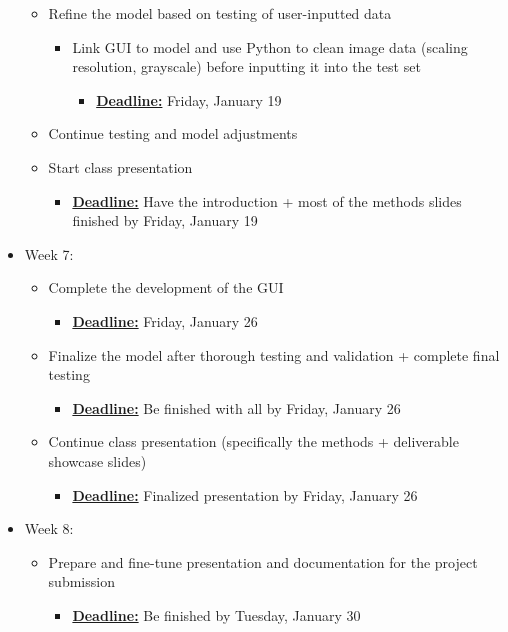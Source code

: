 \documentclass{notes}
\begin{document}
\begin{itemize}
        \begin{itemize}
            \item Refine the model based on testing of user-inputted data
            \begin{itemize}
                \item Link GUI to model and use Python to clean image data (scaling resolution, grayscale) before inputting it into the test set
                \begin{itemize}
                    \item \underline{\textbf{Deadline:}} Friday, January 19
                \end{itemize}
            \end{itemize}
            \item Continue testing and model adjustments
            \item Start class presentation
            \begin{itemize}
                \item \underline{\textbf{Deadline:}} Have the introduction + most of the methods slides finished by Friday, January 19
            \end{itemize}
        \end{itemize}
    \item Week 7:
        \begin{itemize}
            \item Complete the development of the GUI
            \begin{itemize}
                \item \underline{\textbf{Deadline:}} Friday, January 26
            \end{itemize}
            \item Finalize the model after thorough testing and validation + complete final testing
            \begin{itemize}
                \item \underline{\textbf{Deadline:}} Be finished with all by Friday, January 26
            \end{itemize}
            \item Continue class presentation (specifically the methods + deliverable showcase slides)
            \begin{itemize}
                \item \underline{\textbf{Deadline:}} Finalized presentation by Friday, January 26
            \end{itemize}
        \end{itemize}
    \item Week 8:
        \begin{itemize}
            \item Prepare and fine-tune presentation and documentation for the project submission
            \begin{itemize}
                \item \underline{\textbf{Deadline:}} Be finished by Tuesday, January 30
            \end{itemize}
        \end{itemize}
\end{itemize}
\end{document}
